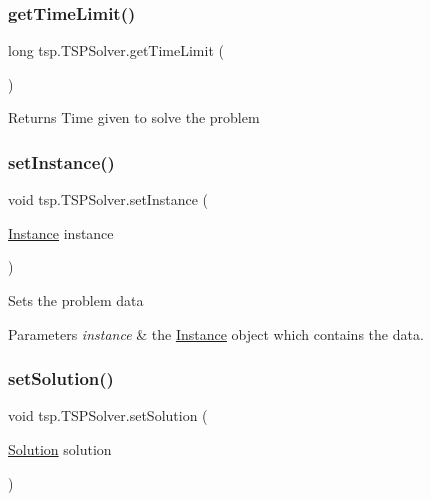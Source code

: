 \subsubsection{\texorpdfstring{get\+Time\+Limit()}{getTimeLimit()}}
{\footnotesize\ttfamily long tsp.\+T\+S\+P\+Solver.\+get\+Time\+Limit (\begin{DoxyParamCaption}{ }\end{DoxyParamCaption})\hspace{0.3cm}{\ttfamily [inline]}}

\begin{DoxyReturn}{Returns}
Time given to solve the problem 
\end{DoxyReturn}
\mbox{\label{classtsp_1_1_t_s_p_solver_a962cd00f504347f89a69b2142dc9a400}} 
\subsubsection{\texorpdfstring{set\+Instance()}{setInstance()}}
{\footnotesize\ttfamily void tsp.\+T\+S\+P\+Solver.\+set\+Instance (\begin{DoxyParamCaption}\item[{\mbox{\hyperlink{classtsp_1_1_instance}{Instance}}}]{instance }\end{DoxyParamCaption})\hspace{0.3cm}{\ttfamily [inline]}}

Sets the problem data 
\begin{DoxyParams}{Parameters}
{\em instance} & the \mbox{\hyperlink{classtsp_1_1_instance}{Instance}} object which contains the data. \\
\hline
\end{DoxyParams}
\mbox{\label{classtsp_1_1_t_s_p_solver_af58c18bddbdd6d8fb67a8d1335913f14}} 
\subsubsection{\texorpdfstring{set\+Solution()}{setSolution()}}
{\footnotesize\ttfamily void tsp.\+T\+S\+P\+Solver.\+set\+Solution (\begin{DoxyParamCaption}\item[{\mbox{\hyperlink{classtsp_1_1_solution}{Solution}}}]{solution }\end{DoxyParamCaption})\hspace{0.3cm}{\ttfamily [inline]}}

